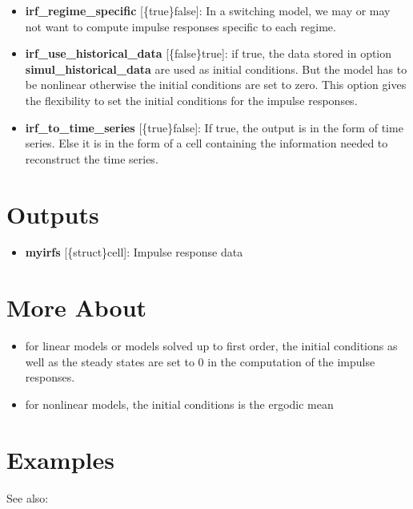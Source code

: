\documentclass[letterpaper,10pt,english]{sphinxmanual}
\begin{document}
\begin{itemize}
\item {} 
\textbf{irf\_regime\_specific} {[}\{true\}\textbar{}false{]}: In a switching model, we may or
may not want to compute impulse responses specific to each regime.

\item {} 
\textbf{irf\_use\_historical\_data} {[}\{false\}\textbar{}true{]}: if true, the data stored in
option \textbf{simul\_historical\_data} are used as initial conditions. But
the model has to be nonlinear otherwise the initial conditions are set
to zero. This option gives the flexibility to set the initial
conditions for the impulse responses.

\item {} 
\textbf{irf\_to\_time\_series} {[}\{true\}\textbar{}false{]}: If true, the output is in the
form of time series. Else it is in the form of a cell containing the
information needed to reconstruct the time series.

\end{itemize}


\section{Outputs}
\label{classes/models/@svar/svar:id31}\begin{itemize}
\item {} 
\textbf{myirfs} {[}\{struct\}\textbar{}cell{]}: Impulse response data

\end{itemize}


\section{More About}
\label{classes/models/@svar/svar:id32}\begin{itemize}
\item {} 
for linear models or models solved up to first order, the initial
conditions as well as the steady states are set to 0 in the computation
of the impulse responses.

\item {} 
for nonlinear models, the initial conditions is the ergodic mean

\end{itemize}


\section{Examples}
\label{classes/models/@svar/svar:id33}
See also:
\end{document}
